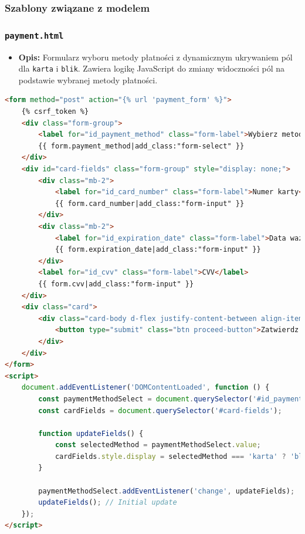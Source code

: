 \documentclass[12pt,a4paper,oneside]{article}
\theoremstyle{definition}
\numberwithin{equation}{section}
\begin{document}
\subsubsection{Szablony związane z modelem}

\subsubsection*{\texttt{payment.html}}
\label{sec:payment_template}

\begin{itemize}
    \item \textbf{Opis:} Formularz wyboru metody płatności z dynamicznym ukrywaniem pól dla \texttt{karta} i \texttt{blik}. Zawiera logikę JavaScript do zmiany widoczności pól na podstawie wybranej metody płatności.
\end{itemize}

\begin{lstlisting}[language=HTML, caption=Szablon payment.html]
<form method="post" action="{% url 'payment_form' %}">
    {% csrf_token %}
    <div class="form-group">
        <label for="id_payment_method" class="form-label">Wybierz metode platnosci</label>
        {{ form.payment_method|add_class:"form-select" }}
    </div>
    <div id="card-fields" class="form-group" style="display: none;">
        <div class="mb-2">
            <label for="id_card_number" class="form-label">Numer karty</label>
            {{ form.card_number|add_class:"form-input" }}
        </div>
        <div class="mb-2">
            <label for="id_expiration_date" class="form-label">Data waznosci</label>
            {{ form.expiration_date|add_class:"form-input" }}
        </div>
        <label for="id_cvv" class="form-label">CVV</label>
        {{ form.cvv|add_class:"form-input" }}
    </div>
    <div class="card">
        <div class="card-body d-flex justify-content-between align-items-center">
            <button type="submit" class="btn proceed-button">Zatwierdz platnosc</button>
        </div>
    </div>
</form>
<script>
    document.addEventListener('DOMContentLoaded', function () {
        const paymentMethodSelect = document.querySelector('#id_payment_method');
        const cardFields = document.querySelector('#card-fields');

        function updateFields() {
            const selectedMethod = paymentMethodSelect.value;
            cardFields.style.display = selectedMethod === 'karta' ? 'block' : 'none';
        }

        paymentMethodSelect.addEventListener('change', updateFields);
        updateFields(); // Initial update
    });
</script>
\end{lstlisting}
\end{document}
